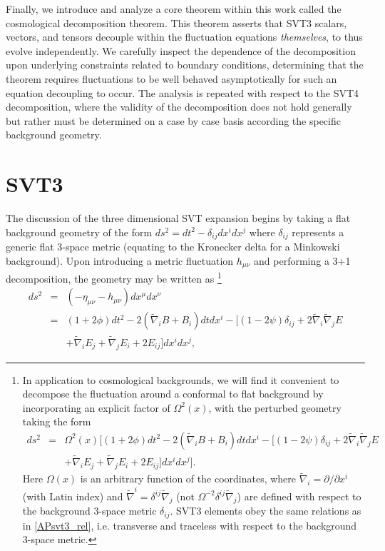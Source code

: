 Finally, we introduce and analyze a core theorem within this work called the cosmological decomposition theorem. This theorem asserts that SVT3 scalars, vectors, and tensors decouple within the fluctuation equations \emph{themselves}, to thus evolve independently. We carefully inspect the dependence of the decomposition upon underlying constraints related to boundary conditions, determining that the theorem requires fluctuations to be well behaved asymptotically for such an equation decoupling to occur. The analysis is repeated with respect to the SVT4 decomposition, where the validity of the decomposition does not hold generally but rather must be determined on a case by case basis according the specific background geometry.
\section{SVT3}
\label{s:svt3}
%
The discussion of the three dimensional SVT expansion begins by taking a flat background geometry of the form $ds^2=dt^2-\delta_{ij}dx^idx^j$ where $\delta_{ij}$ represents a generic flat 3-space metric (equating to the Kronecker delta for a Minkowski background). Upon introducing a metric fluctuation $h_{\mu\nu}$ and performing a 3+1 decomposition, the geometry may be written as
%
	\footnote{In application to cosmological backgrounds, we will find it convenient to decompose the fluctuation around a conformal to flat background by incorporating an explicit factor of $\Omega^2(x)$, with the perturbed geometry taking the form
	\begin{eqnarray}
	ds^2 &=& \Omega^2(x) \bigg[ (1+2\phi) dt^2 -2(\tilde{\nabla}_i B +B_i)dt dx^i - [(1-2\psi)\delta_{ij} +2\tilde{\nabla}_i\tilde{\nabla}_j E
	\nonumber\\
	&& + \tilde{\nabla}_i E_j + \tilde{\nabla}_j E_i + 2E_{ij}]dx^i dx^j\bigg].
	\label{AP62}
	\end{eqnarray}
	Here $\Omega(x)$ is an arbitrary function of the coordinates, where $\tilde{\nabla}_i=\partial/\partial x^i$ (with Latin index) and  $\tilde{\nabla}^i=\delta^{ij}\tilde{\nabla}_j$ (not $\Omega^{-2}\delta^{ij}\tilde{\nabla}_j$) are defined with respect to the background 3-space metric $\delta_{ij}$. SVT3 elements obey the same relations as in \eqref{APsvt3_rel}, i.e. transverse and traceless with respect to the background 3-space metric.}
%
\begin{eqnarray}
ds^2 &=&(-\eta_{\mu\nu}-h_{\mu\nu})dx^{\mu}dx^{\nu}
\nonumber\\
&=&(1+2\phi) dt^2 -2(\tilde{\nabla}_i B +B_i)dt dx^i - [(1-2\psi)\delta_{ij} +2\tilde{\nabla}_i\tilde{\nabla}_j E 
\nonumber\\
&&+ \tilde{\nabla}_i E_j + \tilde{\nabla}_j E_i + 2E_{ij}]dx^i dx^j,
\label{2.1}
\end{eqnarray}
